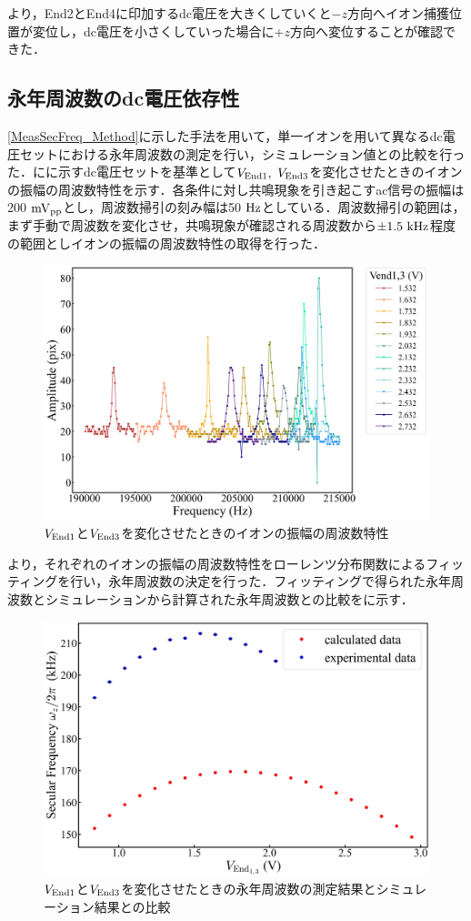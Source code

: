 より，End2とEnd4に印加するdc電圧を大きくしていくと$-z$方向へイオン捕獲位置が変位し，dc電圧を小さくしていった場合に$+z$方向へ変位することが確認できた．

\clearpage

\subsection{永年周波数のdc電圧依存性}\label{quantity_2}
\ref{MeasSecFreq_Method}に示した手法を用いて，単一イオンを用いて異なるdc電圧セットにおける永年周波数の測定を行い，シミュレーション値との比較を行った．にに示すdc電圧セットを基準として$V_{\rm End1}, \ V_{\rm End3}$を変化させたときのイオンの振幅の周波数特性を示す．各条件に対し共鳴現象を引き起こすac信号の振幅は200$\ {\rm mV_{pp}}$とし，周波数掃引の刻み幅は50$\ {\rm Hz}$としている．周波数掃引の範囲は，まず手動で周波数を変化させ，共鳴現象が確認される周波数から$\pm1.5 \ {\rm kHz}$程度の範囲としイオンの振幅の周波数特性の取得を行った．

\begin{figure}[h]
	\begin{center}
		\includegraphics[width = 0.6\linewidth]{./results/figure/end13-SecFreq.jpg}
		\caption{$V_{\rm End1}$と$V_{\rm End3}$を変化させたときのイオンの振幅の周波数特性}
		\label{fig:end13_MeasSec}
	\end{center}
\end{figure}

より，それぞれのイオンの振幅の周波数特性をローレンツ分布関数によるフィッティングを行い，永年周波数の決定を行った．フィッティングで得られた永年周波数とシミュレーションから計算された永年周波数との比較をに示す．

\begin{figure}[h]
	\begin{center}
		\includegraphics[width = 0.6\linewidth]{./results/figure/Vend13-SecFreqZ.jpg}
		\caption{$V_{\rm End1}$と$V_{\rm End3}$を変化させたときの永年周波数の測定結果とシミュレーション結果との比較}
		\label{fig:end13_MeasSec_SimSec}
	\end{center}
\end{figure}

